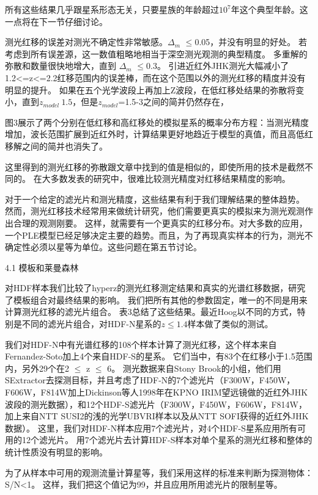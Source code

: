 所有这些结果几乎跟星系形态无关，只要星族的年龄超过$10^7$年这个典型年龄。这一点将在下一节仔细讨论。
 
测光红移的误差对测光不确定性非常敏感。$\Delta_m$ $\leq$0.05，并没有明显的好处。
若考虑到所有误差源，这一数值粗略地相当于深空测光观测的典型精度。
多重解的弥散和数量很快地增大，直到 $\Delta_m$ $\leq$0.3。
引进近红外JHK测光大幅减小了1.2<=z<=2.2红移范围内的误差棒，而在这个范围以外的测光红移的精度并没有明显的提升。
如果在五个光学波段上再加上Z波段，在低红移处结果的弥散将变小，直到$z_{model}~1.5$，但是$z_{model}$=1.5-3之间的简并仍然存在，
 
图3展示了两个分别在低红移和高红移处的模拟星系的概率分布方程：当测光精度增加，波长范围扩展到近红外时，计算结果更好地趋近于模型的真值，而且高低红移解之间的简并也消失了。
 
这里得到的测光红移的弥散跟文章中找到的值是相似的，即使所用的技术是截然不同的。
在大多数发表的研究中，很难比较测光精度对红移结果精度的影响。
 
对于一个给定的滤光片和测光精度，这些结果有利于我们理解结果的整体趋势。
然而，测光红移技术经常用来做统计研究，他们需要更真实的模拟来为测光观测作出合理的观测刚要。
这样，就需要有一个更真实的红移分布。对大多数的应用，一个PLE模型已经足够决定主要的趋势。而且，为了再现真实样本的行为，测光不确定性必须以星等为单位。这些问题在第五节讨论。
 
4.1 模板和莱曼森林
 
对HDF样本我们比较了hyperz的测光红移测定结果和真实的光谱红移数据，研究了模板组合对最终结果的影响。
我们把所有其他的参数固定，唯一的不同是用来计算测光红移的滤光片组合。
表3总结了这些结果。最近Hoog以不同的方式，特别是不同的滤光片组合，对HDF-N星系的$z\leq1.4$样本做了类似的测试。
 
我们对HDF-N中有光谱红移的108个样本计算了测光红移，这个样本来自Fernandez-Soto加上4个来自HDF-S的星系。
它们当中，有83个在红移小于1.5范围内，另外29个在2 $\le$ z $\le$ 6。
测光数据来自Stony Brook的小组，他们用SExtractor去探测目标，并且考虑了HDF-N的7个滤光片（F300W，F450W，F606W，F814W加上Dickinson等人1998年在KPNO IRIM望远镜做的近红外JHK波段的测光数据），和12个HDF-S滤光片（F300W，F450W，F606W，F814W，加上来自NTT SUSI2的浅的光学UBVRI样本以及从NTT SOFI获得的近红外JHK数据）。
这里，我们对HDF-N样本应用7个滤光片，对4个HDF-S星系应用所有可用的12个滤光片。
用7个滤光片去计算HDF-S样本对单个星系的测光红移和整体的统计性质没有明显的影响。
 
为了从样本中可用的观测流量计算星等，我们采用这样的标准来判断为探测物体：S/N<1。
这样，我们把这个值记为99，并且应用所用滤光片的限制星等。
 
